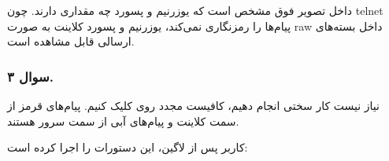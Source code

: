 داخل تصویر فوق مشخص است که یوزرنیم و پسورد چه مقداری دارند. چون telnet پیام‌ها را رمزنگاری نمی‌کند، یوزرنیم و پسورد کلاینت به صورت raw داخل بسته‌های ارسالی قابل مشاهده است.

\pagebreak


\subsubsection*{سوال ۳.}

نیاز نیست کار سختی انجام دهیم، کافیست مجدد روی 
کلیک کنیم. پیام‌های قرمز از سمت کلاینت و پیام‌های آبی از سمت سرور هستند.

کاربر پس از لاگین، این دستورات را اجرا کرده است:

{
}








